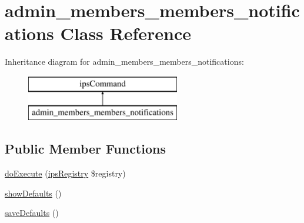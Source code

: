 \hypertarget{classadmin__members__members__notifications}{\section{admin\-\_\-members\-\_\-members\-\_\-notifications Class Reference}
\label{classadmin__members__members__notifications}
}
Inheritance diagram for admin\-\_\-members\-\_\-members\-\_\-notifications\-:\begin{figure}[H]
\begin{center}
\leavevmode
\includegraphics[height=2.000000cm]{classadmin__members__members__notifications}
\end{center}
\end{figure}
\subsection*{Public Member Functions}
\begin{DoxyCompactItemize}
\item 
\hyperlink{classadmin__members__members__notifications_afbc4e912a0604b94d47d66744c64d8ba}{do\-Execute} (\hyperlink{classips_registry}{ips\-Registry} \$registry)
\item 
\hyperlink{classadmin__members__members__notifications_a99de6ac906606f48878479e6a0fbb1bf}{show\-Defaults} ()
\item 
\hyperlink{classadmin__members__members__notifications_a0d008a92e8a8ae806a98838c29381a68}{save\-Defaults} ()
\end{DoxyCompactItemize}
